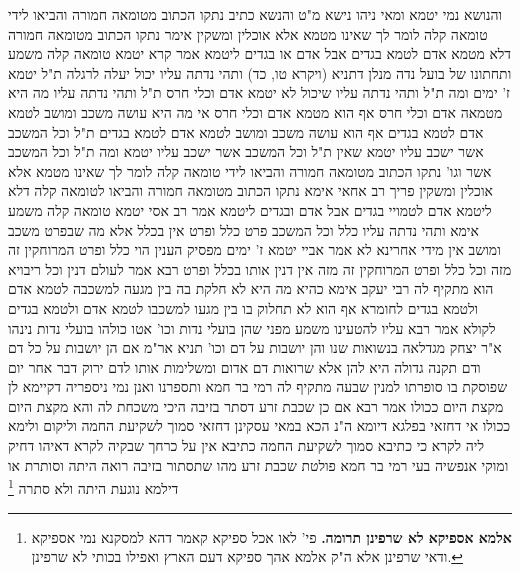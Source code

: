 \documentclass[12pt, openany]{book}
\newcommand{\footnotecomment}[1]{\footnote{#1}}
\newcommand{\commenta}[1]{\footnotecomment{#1}}
\begin{document}
{והנושא נמי יטמא ומאי ניהו נישא מ"ט  והנשא כתיב 
נתקו הכתוב מטומאה חמורה והביאו לידי טומאה קלה לומר לך שאינו מטמא אלא אוכלין ומשקין 
אימר  נתקו הכתוב מטומאה חמורה דלא מטמא אדם לטמא בגדים אבל אדם או בגדים ליטמא  אמר קרא יטמא טומאה קלה משמע 
ותחתונו של בועל נדה מנלן  דתניא (ויקרא טו, כד) ותהי נדתה עליו
יכול יעלה לרגלה ת"ל יטמא ז' ימים 
ומה ת"ל ותהי נדתה עליו  שיכול לא יטמא אדם וכלי חרס ת"ל ותהי נדתה עליו מה היא מטמאה אדם וכלי חרס אף הוא מטמא אדם וכלי חרס 
אי מה היא עושה משכב ומושב לטמא אדם לטמא בגדים אף הוא עושה משכב ומושב לטמא אדם לטמא בגדים  ת"ל  וכל המשכב אשר ישכב עליו יטמא 
שאין ת"ל וכל המשכב אשר ישכב עליו יטמא ומה ת"ל וכל המשכב אשר וגו' נתקו הכתוב מטומאה חמורה והביאו לידי טומאה קלה לומר לך שאינו מטמא אלא אוכלין ומשקין 
פריך רב אחאי  אימא נתקו הכתוב מטומאה חמורה והביאו לטומאה קלה דלא ליטמא אדם לטמויי בגדים אבל אדם ובגדים ליטמא  אמר רב אסי  יטמא טומאה קלה משמע 
אימא  ותהי נדתה עליו כלל וכל המשכב פרט כלל ופרט אין בכלל אלא מה שבפרט  משכב ומושב אין מידי אחרינא לא 
אמר אביי  יטמא ז' ימים מפסיק הענין הוי כלל ופרט המרוחקין זה מזה וכל כלל ופרט המרוחקין זה מזה אין דנין אותו בכלל ופרט 
רבא אמר  לעולם דנין וכל ריבויא הוא 
מתקיף לה רבי יעקב  אימא כהיא מה היא לא חלקת בה בין מגעה למשכבה לטמא אדם ולטמא בגדים לחומרא אף הוא לא תחלוק בו בין מגעו למשכבו לטמא אדם ולטמא בגדים לקולא 
אמר רבא  עליו להטעינו משמע
מפני שהן בועלי נדות וכו' אטו כולהו בועלי נדות נינהו  א"ר יצחק מגדלאה  בנשואות שנו
והן יושבות על דם וכו' תניא אר"מ  אם הן יושבות על כל דם ודם תקנה גדולה היא להן
אלא שרואות דם אדום ומשלימות אותו לדם ירוק 
דבר אחר  יום שפוסקת בו סופרתו למנין שבעה 
מתקיף לה רמי בר חמא  ותספרנו ואנן נמי ניספריה דקיימא לן מקצת היום ככולו 
אמר רבא  אם כן שכבת זרע דסתר בזיבה היכי משכחת לה  והא מקצת היום ככולו 
אי דחזאי בפלגא דיומא ה"נ הכא במאי עסקינן דחזאי סמוך לשקיעת החמה 
וליקום ולימא ליה לקרא  כי כתיבא סמוך לשקיעת החמה כתיבא  אין על כרחך שבקיה לקרא דאיהו דחיק ומוקי אנפשיה 
בעי רמי בר חמא  פולטת שכבת זרע מהו שתסתור בזיבה  רואה היתה וסותרת
או דילמא נוגעת היתה ולא סתרה 
\commenta{\textbf{אלמא אספיקא לא שרפינן תרומה.}  פי' לאו אכל ספיקא קאמר דהא למסקנא נמי אספיקא ודאי שרפינן אלא ה"ק אלמא אהך ספיקא דעם הארץ ואפילו בכותי לא שרפינן. }

}
\end{document}
